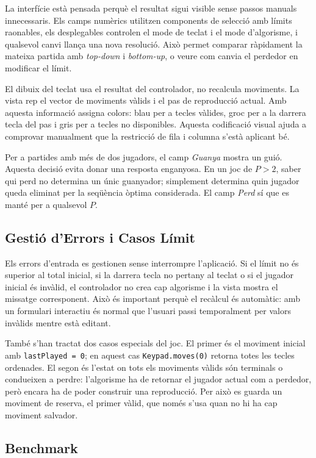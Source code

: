 \documentclass[conference,compsoc]{IEEEtran}
\begin{document}
La interfície està pensada perquè el resultat sigui visible sense passos manuals
innecessaris. Els camps numèrics utilitzen components de selecció amb límits
raonables, els desplegables controlen el mode de teclat i el mode d'algorisme, i
qualsevol canvi llança una nova resolució. Això permet comparar ràpidament la
mateixa partida amb \textit{top-down} i \textit{bottom-up}, o veure com canvia el
perdedor en modificar el límit.

El dibuix del teclat usa el resultat del controlador, no recalcula moviments. La
vista rep el vector de moviments vàlids i el pas de reproducció actual. Amb aquesta
informació assigna colors: blau per a tecles vàlides, groc per a la darrera tecla
del pas i gris per a tecles no disponibles. Aquesta codificació visual ajuda a
comprovar manualment que la restricció de fila i columna s'està aplicant bé.

Per a partides amb més de dos jugadors, el camp \textit{Guanya} mostra un guió.
Aquesta decisió evita donar una resposta enganyosa. En un joc de $P>2$, saber qui
perd no determina un únic guanyador; simplement determina quin jugador queda
eliminat per la seqüència òptima considerada. El camp \textit{Perd} sí que es
manté per a qualsevol $P$.

\subsection{Gestió d'Errors i Casos Límit}

Els errors d'entrada es gestionen sense interrompre l'aplicació. Si el límit no
és superior al total inicial, si la darrera tecla no pertany al teclat o si el
jugador inicial és invàlid, el controlador no crea cap algorisme i la vista mostra
el missatge corresponent. Això és important perquè el recàlcul és automàtic: amb
un formulari interactiu és normal que l'usuari passi temporalment per valors
invàlids mentre està editant.

També s'han tractat dos casos especials del joc. El primer és el moviment inicial
amb \texttt{lastPlayed = 0}; en aquest cas \texttt{Keypad.moves(0)} retorna totes
les tecles ordenades. El segon és l'estat on tots els moviments vàlids són
terminals o condueixen a perdre: l'algorisme ha de retornar el jugador actual com a
perdedor, però encara ha de poder construir una reproducció. Per això es guarda
un moviment de reserva, el primer vàlid, que només s'usa quan no hi ha cap
moviment salvador.

\subsection{Benchmark}
\end{document}
